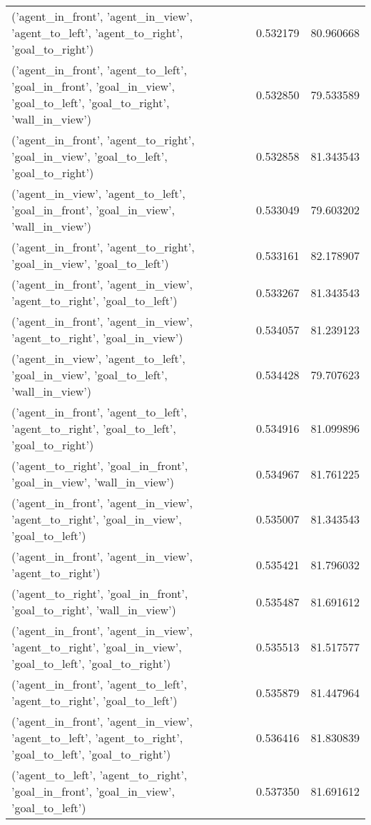 \begin{tabular}{lrr}
('agent\_in\_front', 'agent\_in\_view', 'agent\_to\_left', 'agent\_to\_right', 'goal\_to\_right') & 0.532179 & 80.960668 \\
('agent\_in\_front', 'agent\_to\_left', 'goal\_in\_front', 'goal\_in\_view', 'goal\_to\_left', 'goal\_to\_right', 'wall\_in\_view') & 0.532850 & 79.533589 \\
('agent\_in\_front', 'agent\_to\_right', 'goal\_in\_view', 'goal\_to\_left', 'goal\_to\_right') & 0.532858 & 81.343543 \\
('agent\_in\_view', 'agent\_to\_left', 'goal\_in\_front', 'goal\_in\_view', 'wall\_in\_view') & 0.533049 & 79.603202 \\
('agent\_in\_front', 'agent\_to\_right', 'goal\_in\_view', 'goal\_to\_left') & 0.533161 & 82.178907 \\
('agent\_in\_front', 'agent\_in\_view', 'agent\_to\_right', 'goal\_to\_left') & 0.533267 & 81.343543 \\
('agent\_in\_front', 'agent\_in\_view', 'agent\_to\_right', 'goal\_in\_view') & 0.534057 & 81.239123 \\
('agent\_in\_view', 'agent\_to\_left', 'goal\_in\_view', 'goal\_to\_left', 'wall\_in\_view') & 0.534428 & 79.707623 \\
('agent\_in\_front', 'agent\_to\_left', 'agent\_to\_right', 'goal\_to\_left', 'goal\_to\_right') & 0.534916 & 81.099896 \\
('agent\_to\_right', 'goal\_in\_front', 'goal\_in\_view', 'wall\_in\_view') & 0.534967 & 81.761225 \\
('agent\_in\_front', 'agent\_in\_view', 'agent\_to\_right', 'goal\_in\_view', 'goal\_to\_left') & 0.535007 & 81.343543 \\
('agent\_in\_front', 'agent\_in\_view', 'agent\_to\_right') & 0.535421 & 81.796032 \\
('agent\_to\_right', 'goal\_in\_front', 'goal\_to\_right', 'wall\_in\_view') & 0.535487 & 81.691612 \\
('agent\_in\_front', 'agent\_in\_view', 'agent\_to\_right', 'goal\_in\_view', 'goal\_to\_left', 'goal\_to\_right') & 0.535513 & 81.517577 \\
('agent\_in\_front', 'agent\_to\_left', 'agent\_to\_right', 'goal\_to\_left') & 0.535879 & 81.447964 \\
('agent\_in\_front', 'agent\_in\_view', 'agent\_to\_left', 'agent\_to\_right', 'goal\_to\_left', 'goal\_to\_right') & 0.536416 & 81.830839 \\
('agent\_to\_left', 'agent\_to\_right', 'goal\_in\_front', 'goal\_in\_view', 'goal\_to\_left') & 0.537350 & 81.691612 \\

\end{tabular}
